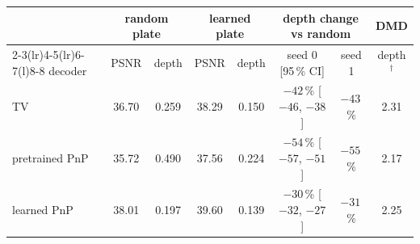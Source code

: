 \begin{tabular}{@{}l cc cc c c c@{}}\toprule
 & \multicolumn{2}{c}{random plate} & \multicolumn{2}{c}{learned plate} & \multicolumn{2}{c}{depth change vs random} & DMD\\
\cmidrule(lr){2-3}\cmidrule(lr){4-5}\cmidrule(lr){6-7}\cmidrule(l){8-8}
decoder & PSNR & depth & PSNR & depth & seed 0 [95\,\% CI] & seed 1 & depth$^\dagger$\\\midrule
TV & 36.70 & 0.259 & 38.29 & 0.150 & $-42$\,\% [$-46$, $-38$] & $-43$\,\% & 2.31\\
pretrained PnP & 35.72 & 0.490 & 37.56 & 0.224 & $-54$\,\% [$-57$, $-51$] & $-55$\,\% & 2.17\\
learned PnP & 38.01 & 0.197 & 39.60 & 0.139 & $-30$\,\% [$-32$, $-27$] & $-31$\,\% & 2.25\\
\bottomrule\end{tabular}
